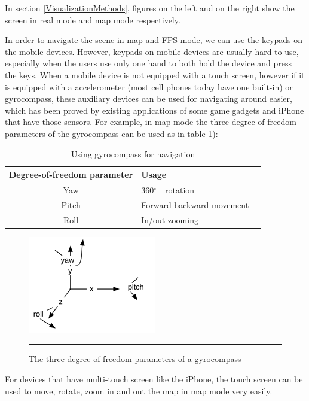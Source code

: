 In section \ref{VisualizationMethods}, figures on the left and on the right show the screen in real mode and map mode respectively.

In order to navigate the scene in map and FPS mode, we can use the keypads on the mobile devices. However, keypads on mobile devices are usually hard to use, especially when the users use only one hand to both hold the device and press the keys. When a mobile device is not equipped with a touch screen, however if it is equipped with a accelerometer (most cell phones today have one built-in) or gyrocompass, these auxiliary devices can be used for navigating around easier, which has been proved by existing applications of some game gadgets and iPhone that have those sensors. For example, in map mode the three degree-of-freedom parameters of the gyrocompass can be used as in table \ref{tb:GyrocompassNavigation}):

\begin{table}[tb]
	\begin{center}
		\caption{Using gyrocompass for navigation}
		\label{tb:GyrocompassNavigation}
		\begin{tabular}{|c|l|l|}
			\hline
			Degree-of-freedom parameter & Usage                     \\
			\hline
			Yaw                         & 360$^\circ$　rotation      \\
			Pitch                       & Forward-backward movement \\
			Roll                        & In/out zooming            \\
			\hline
		\end{tabular}
	\end{center}
\end{table}

\begin{figure}[htbp]
	\centering
	\includegraphics{./Primitives/yaw_pitch_roll.png}
	\rule{35em}{0.5pt}
	\caption[The three degree-of-freedom parameters of a gyrocompass]{The three degree-of-freedom parameters of a gyrocompass}
	\label{fig:YawPitchRoll}
\end{figure}

For devices that have multi-touch screen like the iPhone, the touch screen can be used to move, rotate, zoom in and out the map in map mode very easily.
